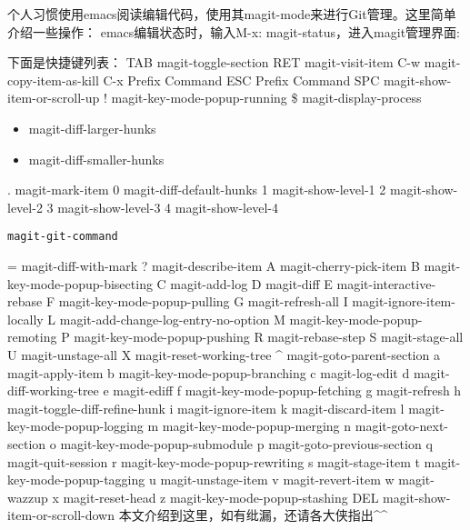 \documentclass[11pt]{ctexart}
\begin{document}
个人习惯使用emacs阅读编辑代码，使用其magit-mode来进行Git管理。这里简单介绍一些操作：
emacs编辑状态时，输入M-x: magit-status，进入magit管理界面:

下面是快捷键列表：
TAB             magit-toggle-section
RET             magit-visit-item
C-w             magit-copy-item-as-kill
C-x             Prefix Command
ESC             Prefix Command
SPC             magit-show-item-or-scroll-up
!               magit-key-mode-popup-running
\$               magit-display-process
\begin{itemize}
\item magit-diff-larger-hunks
\item magit-diff-smaller-hunks
\end{itemize}
.               magit-mark-item
0               magit-diff-default-hunks
1               magit-show-level-1
2               magit-show-level-2
3               magit-show-level-3
4               magit-show-level-4
\begin{verbatim}
magit-git-command
\end{verbatim}
=               magit-diff-with-mark
?               magit-describe-item
A               magit-cherry-pick-item
B               magit-key-mode-popup-bisecting
C               magit-add-log
D               magit-diff
E               magit-interactive-rebase
F               magit-key-mode-popup-pulling
G               magit-refresh-all
I               magit-ignore-item-locally
L               magit-add-change-log-entry-no-option
M               magit-key-mode-popup-remoting
P               magit-key-mode-popup-pushing
R               magit-rebase-step
S               magit-stage-all
U               magit-unstage-all
X               magit-reset-working-tree
\^{}               magit-goto-parent-section
a               magit-apply-item
b               magit-key-mode-popup-branching
c               magit-log-edit
d               magit-diff-working-tree
e               magit-ediff
f               magit-key-mode-popup-fetching
g               magit-refresh
h               magit-toggle-diff-refine-hunk
i               magit-ignore-item
k               magit-discard-item
l               magit-key-mode-popup-logging
m               magit-key-mode-popup-merging
n               magit-goto-next-section
o               magit-key-mode-popup-submodule
p               magit-goto-previous-section
q               magit-quit-session
r               magit-key-mode-popup-rewriting
s               magit-stage-item
t               magit-key-mode-popup-tagging
u               magit-unstage-item
v               magit-revert-item
w               magit-wazzup
x               magit-reset-head
z               magit-key-mode-popup-stashing
DEL             magit-show-item-or-scroll-down
本文介绍到这里，如有纰漏，还请各大侠指出\^{}\^{}
\end{document}

